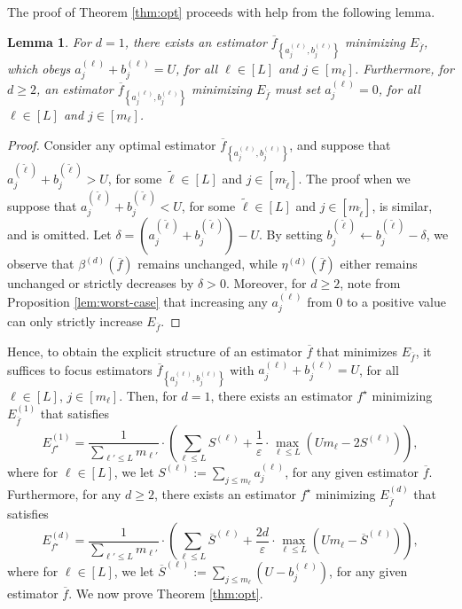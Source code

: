 \documentclass[conference,letterpaper]{IEEEtran}
\newtheorem{lemma}{Lemma}[section]
\theoremstyle{remark}
\theoremstyle{definition}
\begin{document}
The proof of Theorem \ref{thm:opt} proceeds with help from the following lemma.
\begin{lemma}
	\label{lem:helper}
	For $d = 1$, there exists an estimator $\overline{f}_{\left\{a_j^{(\ell)},b_j^{(\ell)}\right\}}$ minimizing $E_{\overline{f}}$, which obeys $a_j^{(\ell)}+b_j^{(\ell)} = U$, for all $\ell\in [L]$ and $j\in [m_\ell]$. Furthermore, for $d\geq 2$, an estimator $\overline{f}_{\left\{a_j^{(\ell)},b_j^{(\ell)}\right\}}$ minimizing $E_{\overline{f}}$ must set $a_j^{(\ell)} = 0$, for all $\ell\in [L]$ and $j\in [m_\ell]$.
\end{lemma}
\begin{proof}
	Consider any optimal estimator $\overline{f}_{\left\{a_j^{(\ell)},b_j^{(\ell)}\right\}}$, and suppose that $a_j^{(\tilde{\ell})}+b_j^{(\tilde{\ell})}>U$, for some $\tilde{\ell}\in [L]$ and $j\in [m_{\tilde{\ell}}]$. The proof when we suppose that $a_j^{(\tilde{\ell})}+b_j^{(\tilde{\ell})}<U$, for some $\tilde{\ell}\in [L]$ and $j\in [m_{\tilde{\ell}}]$, is similar, and is omitted. Let $\delta =  (a_j^{(\tilde{\ell})}+b_j^{(\tilde{\ell})})-U$. By setting $b_j^{(\tilde{\ell})}\gets b_j^{(\tilde{\ell})}-\delta$, we observe that $\beta^{(d)}(\overline{f})$ remains unchanged, while $\eta^{(d)}(\overline{f})$ either remains unchanged or strictly decreases by $\delta>0$. Moreover, for $d\geq 2$, note from Proposition \ref{lem:worst-case} that increasing any $a_j^{(\ell)}$ from $0$ to a positive value can only strictly increase $E_{\overline{f}}$.
\end{proof}
Hence, to obtain the explicit structure of an estimator $\overline{f}$ that minimizes $E_{\overline{f}}$, it suffices to focus estimators $\overline{f}_{\left\{a_j^{(\ell)},b_j^{(\ell)}\right\}}$ with $a_j^{(\ell)}+b_j^{(\ell)} = U$, for all $\ell\in [L]$, $j\in [m_\ell]$. Then, for $d=1$, there exists an estimator $f^\star$ minimizing $E^{(1)}_{\overline{f}}$ that satisfies
\begin{equation}
	\label{eq:optsimp1}
	E^{(1)}_{f^\star} = \frac{1}{\sum_{\ell'\leq L} m_{\ell'}}\cdot \left(\sum_{\ell\leq L} S^{(\ell)}+\frac{1}{\varepsilon}\cdot \max_{\ell\leq L} \left(Um_\ell - 2S^{(\ell)}\right)\right),
\end{equation}
where for $\ell\in [L]$, we let $S^{(\ell)}:= \sum_{j\leq m_\ell} a_j^{(\ell)}$, for any given estimator $\overline{f}$. Furthermore, for any $d\geq 2$, there exists an estimator $f^\star$ minimizing $E^{(d)}_{\overline{f}}$ that satisfies
\begin{equation}
	\label{eq:optsimpd}
	E^{(d)}_{f^\star} = \frac{1}{\sum_{\ell'\leq L} m_{\ell'}}\cdot \left(\sum_{\ell\leq L} \overline{S}^{(\ell)}+\frac{2d}{\varepsilon}\cdot \max_{\ell\leq L} \left(Um_\ell - \overline{S}^{(\ell)}\right)\right),
\end{equation}
where for $\ell\in [L]$, we let $\overline{S}^{(\ell)}:= \sum_{j\leq m_\ell} \left(U - b_j^{(\ell)}\right)$, for any given estimator $\overline{f}$. We now prove Theorem \ref{thm:opt}.
\end{document}
